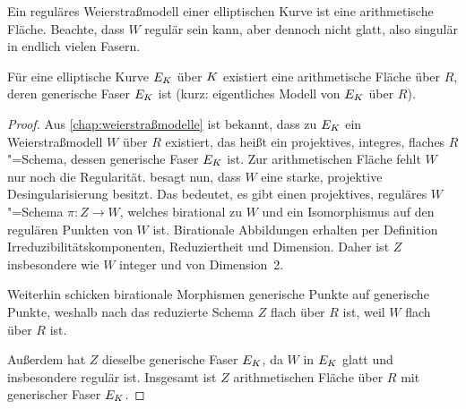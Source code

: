 \begin{Beispiel}\label{bsp:regweierstraßmodell}
  Ein reguläres Weierstraßmodell einer elliptischen Kurve ist eine
  arithmetische Fläche.
  Beachte, dass $W$ regulär sein kann, aber dennoch nicht glatt, also
  singulär in endlich vielen Fasern.
\end{Beispiel}

\begin{Satz}\label{thm:exarithfl}
  Für eine elliptische Kurve $E_{K}$ über $K$ existiert eine
  arithmetische Fläche über $R$, deren generische Faser $E_{K}$ ist
  (kurz: eigentliches Modell von $E_{K}$ über $R$).
  \begin{proof}
    Aus \autoref{chap:weierstraßmodelle} ist bekannt, dass zu $E_{K}$
    ein Weierstraßmodell $W$ über $R$ existiert, das heißt
    ein projektives, integres, flaches $R$"=Schema, dessen generische
    Faser $E_{K}$ ist. Zur arithmetischen Fläche fehlt $W$ nur noch die
    Regularität.
    \cite[Corollary~8.3.51]{liu} besagt nun, dass $W$ eine starke,
    projektive Desingularisierung besitzt. Das bedeutet, es gibt
    einen projektives, reguläres $W$"=Schema ${\pi\colon Z\to W}$,
    welches birational zu $W$ und ein Isomorphismus auf den regulären
    Punkten von $W$ ist.
    Birationale Abbildungen erhalten per Definition
    Irreduzibilitätskomponenten, Reduziertheit und Dimension.
    Daher ist $Z$ insbesondere wie $W$ integer
    und von Dimension~2.

    Weiterhin schicken birationale Morphismen generische Punkte auf
    generische Punkte, weshalb nach
    \cite[Proposition~III.9.7]{hartshorne} das reduzierte Schema $Z$
    flach über $R$ ist, weil $W$ flach über $R$ ist.

    Außerdem hat $Z$ dieselbe generische Faser $E_{K}$, da
    $W$ in $E_{K}$ glatt und insbesondere regulär ist.
    Insgesamt ist $Z$ arithmetischen Fläche über $R$ mit
    generischer Faser $E_{K}$.
  \end{proof}
\end{Satz}

